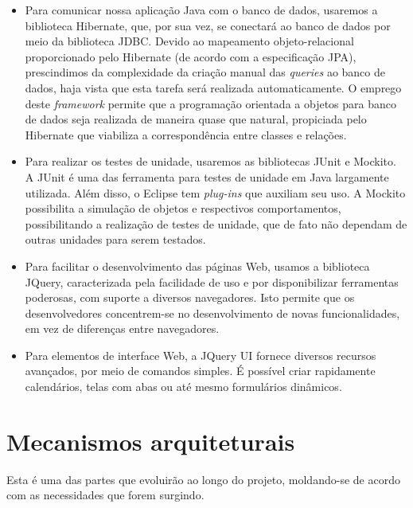 \documentclass[11pt, a4paper]{article}
\begin{document}
\begin{itemize}
            \item Para comunicar nossa aplicação Java com o banco de dados,
            usaremos a biblioteca Hibernate, que, por sua vez, se conectará ao banco de dados por meio da biblioteca JDBC. Devido ao mapeamento objeto-relacional
            proporcionado pelo Hibernate (de acordo com a especificação JPA), prescindimos da 
complexidade da criação manual das
            \textit{queries} ao banco de dados, haja vista que esta tarefa será realizada  automaticamente. O emprego deste \emph{framework} permite que a programação orientada a objetos para banco de dados seja realizada de maneira quase que natural, propiciada pelo Hibernate que viabiliza a correspondência entre classes e relações.

            \item Para realizar os testes de unidade, usaremos as
            bibliotecas JUnit e Mockito. A JUnit é uma das ferramenta para testes de unidade em 
			Java largamente utilizada. Além disso, o Eclipse tem \textit{plug-ins} que auxiliam seu uso. 
A Mockito possibilita a simulação de objetos e respectivos comportamentos, possibilitando a realização de testes de unidade,  que de fato não dependam de outras unidades para serem testados.
			
			\item Para facilitar o desenvolvimento das páginas Web, usamos a 
			biblioteca JQuery, caracterizada pela facilidade de uso e por disponibilizar ferramentas
			poderosas, com suporte a diversos navegadores. Isto permite que os
			desenvolvedores concentrem-se no desenvolvimento de novas funcionalidades, em vez de 			diferenças entre navegadores.
			
			\item Para elementos de interface Web, a JQuery UI fornece diversos
			recursos avançados, por meio de comandos simples. É possível criar rapidamente calendários, telas com abas ou até mesmo formulários dinâmicos.
			
        \end{itemize}
    
    \section{Mecanismos arquiteturais}
        Esta é uma das partes que evoluirão ao longo do projeto, moldando-se de
        acordo com as necessidades que forem surgindo.
\end{document}
